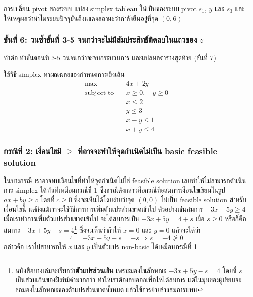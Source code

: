 \begin{example}
    {การเปลี่ยน pivot ของระบบ}{}
    แปลง simplex tableau ให้เป็นของระบบ pivot $s_1$, $y$ และ $s_3$ และให้เหตุผลว่าทำไมระบบปัจจุบันถึงแสดงสถานะว่ากำลังยืนอยู่ที่จุด $(0,6)$
\end{example}
\newpage
\subsubsection*{ขั้นที่ 6: วนซ้ำขั้นที่ 3-5 จนกว่าจะไม่มีสัมประสิทธิ์ติดลบในแถวของ $z$}
\begin{example}
    {ทำต่อ}{}
    ทำขั้นตอนที่ 3-5 วนจนกว่าจะจบกระบวนการ และแปลผลตารางสุดท้าย (ขั้นที่ 7)
\end{example}
\newpage
\begin{example}
    {}{}
    ใช้วิธี simplex หาผลเฉลยของกำหนดการเชิงเส้น
    \begin{align*}
        \max \quad & 4x + 2y \\
        \text{subject to} \quad
        & x \geq 0, \quad y \geq 0 \\
        & x \leq 2 \\
        & y \leq 3 \\
        & x - y \leq 1\\
        & x + y \leq 4
    \end{align*}
\end{example}
\newpage

\subsubsection{กรณีที่ 2: เงื่อนไขมี $\geq$ ที่อาจจะทำให้จุดกำเนิดไม่เป็น basic feasible solution}
ในบางกรณี เราอาจพบเงื่อนไขที่ทำให้จุดกำเนิดไม่ใช่ feasible solution เลยทำให้ไม่สามารถดำเนินการ simplex ได้ทันทีเหมือนกรณีที่ 1
ซึ่งกรณีดังกล่าวคือกรณีที่อสมการเงื่อนไขเขียนในรูป $ax + by \geq c$ โดยที่ $c \geq 0$ ซึ่งจะเห็นได้โดยง่ายว่าจุด $(0,0)$ ไม่เป็น feasible solution สำหรับเงื่อนไขนี้
แต่ถึงแม้เราจะใช้วิธีการการเพิ่มตัวแปรส่วนขาดเข้าไป ตัวอย่างเช่นสมการ $-3x + 5y \geq 4$ เมื่อเราทำการเพิ่มตัวแปรส่วนขาดเข้าไป จะได้สมการเป็น $-3x + 5y = 4 + s$ เมื่อ $s \geq 0$ หรือก็คือสมการ $-3x + 5y - s = 4$\footnote{หนังสือบางเล่มจะเรียกว่า\textbf{ตัวแปรส่วนเกิน} เพราะมองในลักษณะ $-3x + 5y - s = 4$ โดยที่ $s$ เป็นส่วนเกินของฝั่งที่มีค่ามากกว่า ทำให้เราต้องลบออกเพื่อให้ได้สมการ แต่ในมุมของผู้เขียนจะขอมองในลักษณะของตัวแปรส่วนขาดทั้งหมด แล้วใช้การย้ายข้างสมการแทน}
ซึ่งจะเห็นว่าถ้าให้ $x=0$ และ $y=0$ แล้วจะได้ว่า
$$
4 = -3x + 5y - s = -s \Longrightarrow s = -4 \ngeq 0
$$
กล่าวคือ เราไม่สามารถให้ $x$ และ $y$ เป็นตัวแปร non-basic ได้เหมือนกรณีที่ 1 

